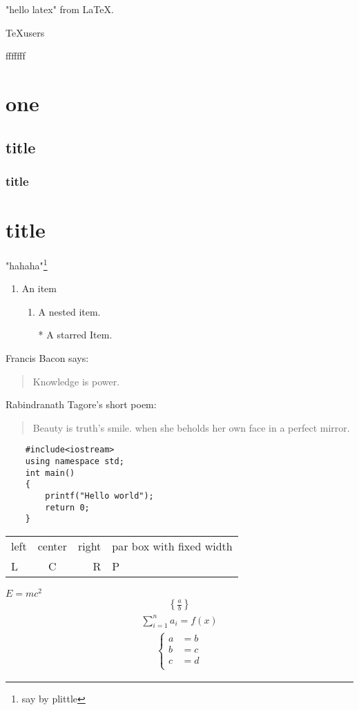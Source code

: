 \documentclass{article}
\begin{document}
\tableofcontents
\newpage
"hello latex" from \LaTeX .

\TeX users

f{}f{}f{}ffff

\section[1]{one}
\subsection[hahaha]{title}
\subsubsection[3]{title}
\section[2]{title}

"hahaha"\footnote{say by plittle}
\begin{enumerate}
    \item  An item
          \begin{enumerate}
              \item A nested item.
              \item[*] A starred Item.

          \end{enumerate}
\end{enumerate}
Francis Bacon says:
\begin{quote}
    Knowledge is power.
\end{quote}
Rabindranath Tagore's short poem:
\begin{verse}
    Beauty is truth's smile.
    when she beholds her own face in a perfect mirror.
\end{verse}
\begin{verbatim}
    #include<iostream>
    using namespace std;
    int main()
    {
        printf("Hello world");
        return 0;
    }
\end{verbatim}

\begin{tabular}{lcr|p{6em}}
    \hline
    left & center                   & right
         & par box with fixed width             \\
    L    & C                        & R     & P \\
    \hline
\end{tabular}

$ E=mc^2 $
\begin{align}
    \left\{\frac{a}{b}\right\}
\end{align}
\begin{gather}
    \sum_{i=1}^{n} a_i=f(x)
\end{gather}
\begin{align}
    \left\{
    \begin{aligned}
        a & =b \\
        b & =c \\
        c & =d \\
    \end{aligned}
    \right.
\end{align}
\end{document}

